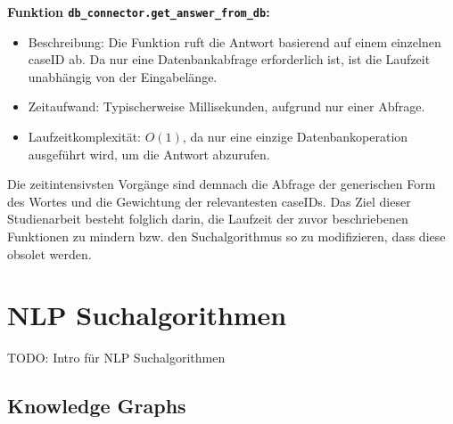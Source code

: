 \textbf{Funktion \lstinline|db_connector.get_answer_from_db|:}
\begin{itemize}
    \item Beschreibung: Die Funktion ruft die Antwort basierend auf einem einzelnen caseID ab. Da nur eine Datenbankabfrage erforderlich ist, ist die Laufzeit unabhängig von der Eingabelänge.
    \item Zeitaufwand: Typischerweise Millisekunden, aufgrund nur einer Abfrage.
    \item Laufzeitkomplexität: \( O(1) \), da nur eine einzige Datenbankoperation ausgeführt wird, um die Antwort abzurufen.
\end{itemize}
Die zeitintensivsten Vorgänge sind demnach die Abfrage der generischen Form des Wortes und die Gewichtung der relevantesten caseIDs. Das Ziel dieser Studienarbeit besteht folglich darin, die Laufzeit der zuvor beschriebenen Funktionen zu mindern bzw. den Suchalgorithmus so zu modifizieren, dass diese obsolet werden. 

\newpage
\section{NLP Suchalgorithmen}
TODO: Intro für NLP Suchalgorithmen 

\subsection{Knowledge Graphs}
